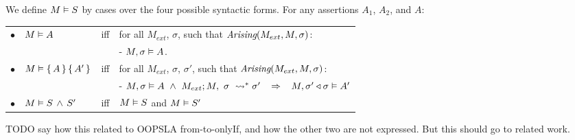 \begin{definition}
We define $M \vDash {S}$ by cases over the four possible syntactic forms.
For any assertions   $A_1$, $A_2$, and $A$: \\

\label{def:necessity-semantics}

\begin{tabular}{llcl}
$\bullet$ & $M \vDash {A}$& iff & for all $M_{ext}$, $\sigma$, such that $\textit{Arising}(M_{ext}, M, \sigma)$: \ \    \\
 & & & - $M , \sigma \vDash A$.  
\\
$\bullet$ &  $M \vDash {\{}\, A \,{\}} \, {\{}\, A'\, {\}} $ &  iff   &  for all $M_{ext}$, $\sigma$, $\sigma'$, such that $\textit{Arising}(M_{ext}, M, \sigma)$: \\  
 & & & -   $\satisfiesA{M}{\sigma}{A}\  \wedge \ \reductions{M_{ext}}{M}{\sigma}{\sigma'} \;\;\;\Rightarrow\;\;\; \satisfiesA{M}{\sigma' \triangleleft \sigma}{A'}$   
\\
$\bullet$ &  $M \vDash S\, \wedge\, S'$ &   iff   & $M \vDash S$ and $M \vDash S'$
\end{tabular} 

 
\end{definition} 

TODO say how this related to OOPSLA from-to-onlyIf, and how the other two are not expressed. But this should go to related work.

